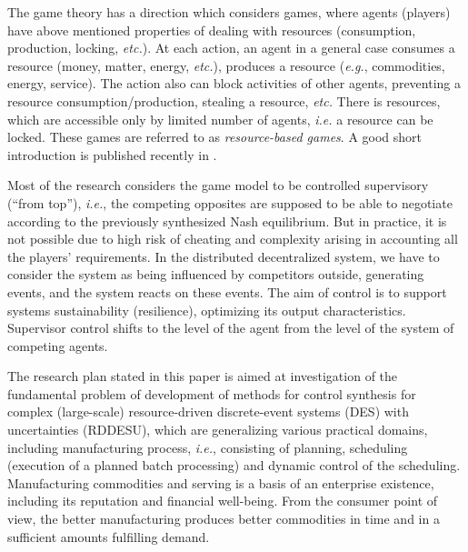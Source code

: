 \documentclass[runningheads]{llncs}
\begin{document}

The game theory has a direction which considers games, where agents (players) have above mentioned properties of dealing with resources (consumption, production, locking, \emph{etc.}).  At each action, an agent in a general case consumes a resource (money, matter, energy, \emph{etc.}), produces a resource (\emph{e.g.}, commodities, energy, service).  The action also can block activities of other agents, preventing a resource consumption/production, stealing a resource, \emph{etc.}  There is resources, which are accessible only by limited number of agents, \emph{i.e.} a resource can be locked. These games are referred to as \emph{resource-based games}. A good short introduction is published recently in \cite{rbg}.

Most of the research considers the game model to be controlled supervisory (“from top”), \emph{i.e.}, the competing opposites are supposed to be able to negotiate according to the previously synthesized Nash equilibrium. But in practice, it is not possible due to high risk of cheating and complexity arising in accounting all the players’ requirements. In the distributed decentralized system, we have to consider the system as being influenced by competitors outside, generating events, and the system reacts on these events. The aim of control is to support systems sustainability (resilience), optimizing its output characteristics. Supervisor control shifts to the level of the agent from the level of the system of competing agents. %

The research plan stated in this paper is aimed at investigation of the fundamental problem of development of methods for control synthesis for complex (large-scale) resource-driven discrete-event systems (DES) with uncertainties (RDDESU), which are generalizing various practical domains, including manufacturing process, \emph{i.e.}, consisting of planning, scheduling (execution of a planned batch processing) and dynamic control of the scheduling.  Manufacturing commodities and serving is a basis of an enterprise existence, including its reputation and financial well-being. From the consumer point of view, the better manufacturing produces better commodities in time and in a sufficient amounts fulfilling demand.
\end{document}
